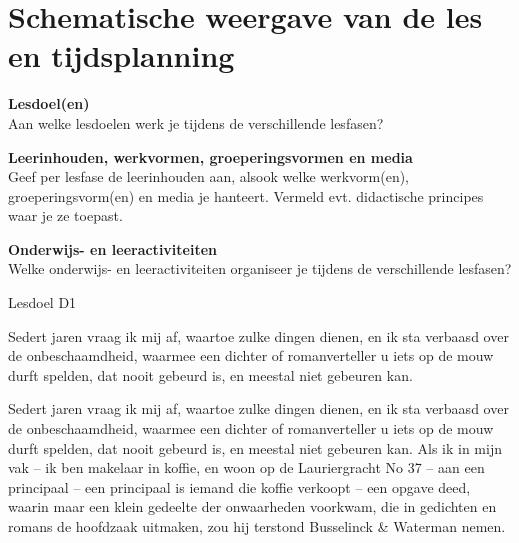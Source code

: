 \section{Schematische weergave van de les en tijdsplanning}

\noindent\colorbox{mygray}{%
    \begin{minipage}[t]{\lesdoelwidth}
        \textbf{Lesdoel(en)} \\
        Aan welke lesdoelen werk je tijdens de verschillende lesfasen?
    \end{minipage}\hspace{\lesspacingwidth}%
    \begin{minipage}[t]{\lesinhoudwidth}
        \textbf{Leerinhouden, werkvormen, groeperingsvormen en media} \\
        Geef per lesfase de leerinhouden aan, alsook welke werkvorm(en), groeperingsvorm(en) en media je hanteert. 
        Vermeld evt. didactische principes waar je ze toepast.
    \end{minipage}\hspace{\lesspacingwidth}%
    \begin{minipage}[t]{\lesactiviteitwidth}
        \textbf{Onderwijs- en leeractiviteiten} \\
        Welke onderwijs- en leeractiviteiten organiseer je tijdens de verschillende lesfasen?
    \end{minipage}%
}

\begin{minipage}[t]{\lesdoelwidth}
    Lesdoel D1
\end{minipage}\hspace{\lesspacingwidth}%
\begin{minipage}[t]{\lesinhoudwidth}
    Sedert jaren vraag ik mij af, waartoe zulke dingen dienen, en ik sta verbaasd over de onbeschaamdheid, waarmee een dichter of romanverteller u iets op de mouw durft spelden, dat nooit gebeurd is, en meestal niet gebeuren kan.
\end{minipage}\hspace{\lesspacingwidth}%
\begin{minipage}[t]{\lesactiviteitwidth}
    Sedert jaren vraag ik mij af, waartoe zulke dingen dienen, en ik sta verbaasd over de onbeschaamdheid, waarmee een dichter of romanverteller u iets op de mouw durft spelden, dat nooit gebeurd is, en meestal niet gebeuren kan.
    Als ik in mijn vak -- ik ben makelaar in koffie, en woon op de Lauriergracht No 37 -- aan een principaal -- een principaal is iemand die koffie verkoopt -- een opgave deed, waarin maar een klein gedeelte der onwaarheden voorkwam, die in gedichten en romans de hoofdzaak uitmaken, zou hij terstond Busselinck \& Waterman nemen.
\end{minipage}

